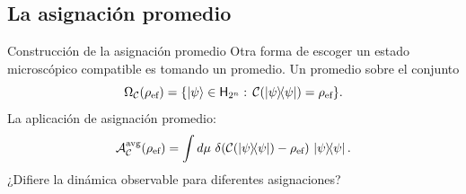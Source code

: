 \subsection{La asignación promedio}
\begin{frame}{Construcción de la asignación promedio}
    Otra forma de escoger un estado microscópico compatible \pause es tomando un promedio. \pause Un promedio sobre el conjunto \pause
    \begin{equation}
        \Omega_{\mcC}(\rho_{\ef}) = \{\ket{\psi}\in\hilbert_{2^{n}}:\, \mcC(\dyad{\psi}) = \rho_{\ef}  \}.\nonumber
    \end{equation}\pause
    La aplicación de asignación promedio: \pause
    \begin{equation}
        \mcA_{\mcC}^{\avg}(\rho_{\ef}) =\int d \mu\,\, \delta(\mcC(\dyad{\psi})-\rho_{\ef})\,\dyad{\psi}.\nonumber
    \end{equation} \pause
    ¿Difiere la dinámica observable para diferentes asignaciones?
\end{frame}
